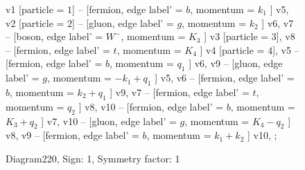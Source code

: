 \documentclass{revtex4}
\begin{document}
\begin{figure}[!htb]
\begin{center}
{    %
v1 [particle = \(1\)] -- [fermion, edge label' = \(b\), momentum = \(k_{1}\) ] v5, 
v2 [particle = \(2\)] -- [gluon, edge label' = \(g\), momentum = \(k_{2}\) ] v6, 
v7 -- [boson, edge label' = \(W^{-}\), momentum = \(K_{3}\) ] v3 [particle = \(3\)], 
v8 -- [fermion, edge label' = \(t\), momentum = \(K_{4}\) ] v4 [particle = \(4\)], 
v5 -- [fermion, edge label' = \(b\), momentum = \(q_{1}\) ] v6, 
v9 -- [gluon, edge label' = \(g\), momentum = \(-k_{1} + q_{1}\) ] v5, 
v6 -- [fermion, edge label' = \(b\), momentum = \(k_{2} + q_{1}\) ] v9, 
v7 -- [fermion, edge label' = \(t\), momentum = \(q_{2}\) ] v8, 
v10 -- [fermion, edge label' = \(b\), momentum = \(K_{3} + q_{2}\) ] v7, 
v10 -- [gluon, edge label' = \(g\), momentum = \(K_{4} - q_{2}\) ] v8, 
v9 -- [fermion, edge label' = \(b\), momentum = \(k_{1} + k_{2}\) ] v10, 
};
\end{center}
\caption{Diagram220, Sign: 1, Symmetry factor: 1}
\end{figure}
\newpage
\end{document}
